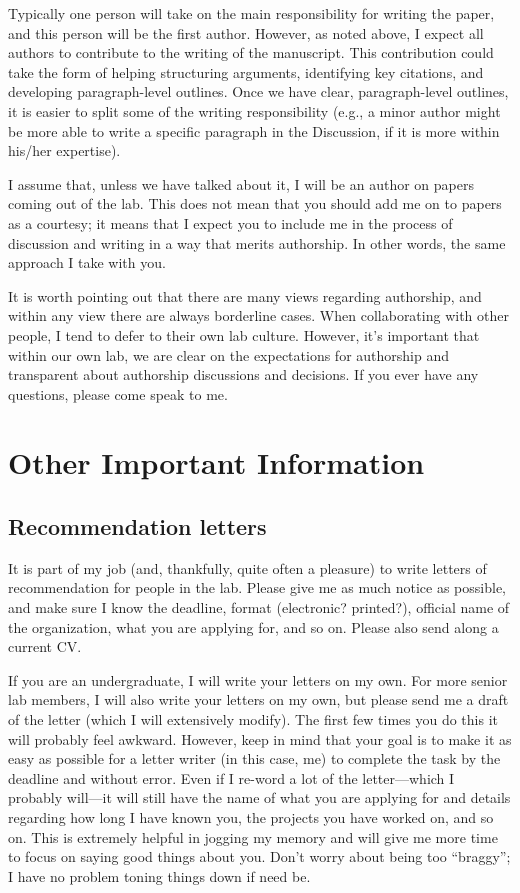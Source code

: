 \documentclass[letterpaper,12pt,oneside]{memoir}
\begin{document}
Typically one person will take on the main responsibility for writing the paper, and this person will be the first author. However, as noted above, I expect all authors to contribute to the writing of the manuscript. This contribution could take the form of helping structuring arguments, identifying key citations, and developing paragraph-level outlines. Once we have clear, paragraph-level outlines, it is easier to split some of the writing responsibility (e.g., a minor author might be more able to write a specific paragraph in the Discussion, if it is more within his/her expertise).

I assume that, unless we have talked about it, I will be an author on papers coming out of the lab. This does not mean that you should add me on to papers as a courtesy; it means that I expect you to include me in the process of discussion and writing in a way that merits authorship. In other words, the same approach I take with you.

It is worth pointing out that there are many views regarding authorship, and within any view there are always borderline cases. When collaborating with other people, I tend to defer to their own lab culture. However, it's important that within our own lab, we are clear on the expectations for authorship and transparent about authorship discussions and decisions. If you ever have any questions, please come speak to me.


\chapter{Other Important Information}
\section{Recommendation letters}
It is part of my job (and, thankfully, quite often a pleasure) to write letters of recommendation for people in the lab. Please give me as much notice as possible, and make sure I know the deadline, format (electronic? printed?), official name of the organization, what you are applying for, and so on. Please also send along a current CV.

If you are an undergraduate, I will write your letters on my own. For more senior lab members, I will also write your letters on my own, but please send me a draft of the letter (which I will extensively modify). The first few times you do this it will probably feel awkward. However, keep in mind that your goal is to make it as easy as possible for a letter writer (in this case, me) to complete the task by the deadline and without error. Even if I re-word a lot of the letter---which I probably will---it will still have the name of what you are applying for and details regarding how long I have known you, the projects you have worked on, and so on. This is extremely helpful in jogging my memory and will give me more time to focus on saying good things about you. Don't worry about being too ``braggy''; I have no problem toning things down if need be.
\end{document}
